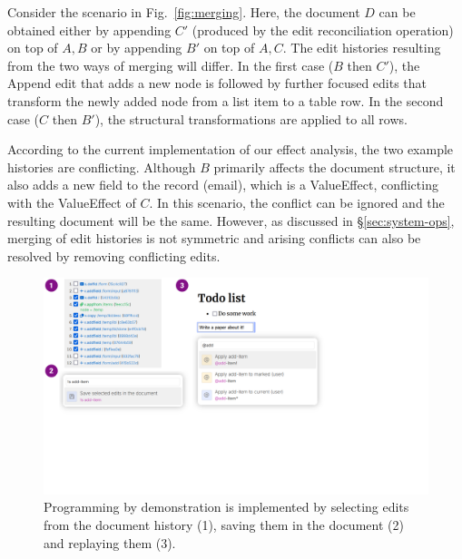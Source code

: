 \documentclass[sigconf]{acmart}
\newcommand{\note}[1]{}
\newcommand{\ident}[1]{{\sffamily #1}}
\begin{document}
Consider the scenario in Fig.~\ref{fig:merging}. Here, the document $D$ can be obtained
either by appending $C'$ (produced by the edit reconciliation operation) on top of $A,B$ or by
appending $B'$ on top of $A,C$. The edit histories resulting from the two ways of merging will
differ. In the first case ($B$ then $C'$), the \ident{Append} edit that adds a new node is followed
by further focused edits that transform the newly added node from a list item to a table row.
In the second case ($C$ then $B'$), the structural transformations are applied to all rows.

According to the current implementation of our effect analysis, the two example histories are conflicting.
Although $B$ primarily affects the document structure, it also adds a new field to the record (email),
which is a \ident{ValueEffect}, conflicting with the \ident{ValueEffect} of $C$. In this scenario, the
conflict can be ignored and the resulting document will be the same.  However, as discussed
in \S\ref{sec:system-ops}, merging of edit histories is not symmetric and arising conflicts
can also be resolved by removing conflicting edits.



\begin{figure}[t]
\includegraphics[width=0.9\columnwidth,clip,trim=0cm 7cm 9cm 0cm]{fig/pbd.pdf}
\caption{Programming by demonstration is implemented by selecting edits from the document
history (1), saving them in the document (2) and replaying them (3).}
\label{fig:pbd}
\end{figure}
\end{document}
